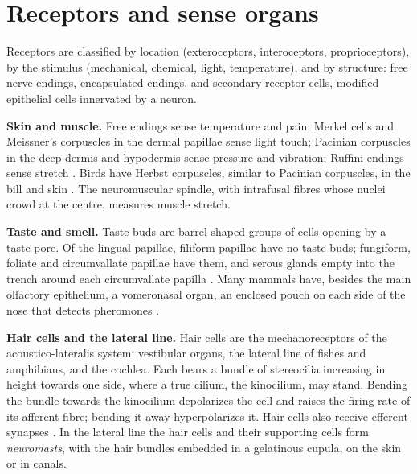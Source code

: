 \section{Receptors and sense organs}
\label{section-senses}

Receptors are classified by location
(exteroceptors, interoceptors,
proprioceptors), by the stimulus (mechanical,
chemical, light, temperature), and by
structure: free nerve endings, encapsulated
endings, and secondary receptor cells,
modified epithelial cells innervated by a
neuron.

\textbf{Skin and muscle.} Free endings sense
temperature and pain; Merkel cells and
Meissner's corpuscles in the dermal papillae
sense light touch; Pacinian corpuscles in the
deep dermis and hypodermis sense pressure and
vibration; Ruffini endings sense stretch
\cite[Chapter 15]{ross2011histology}. Birds
have Herbst corpuscles, similar to Pacinian
corpuscles, in the bill and skin
\cite[Chapter 9]{bacha2000veterinary}. The
neuromuscular spindle, with intrafusal fibres
whose nuclei crowd at the centre, measures
muscle stretch.

\textbf{Taste and smell.} Taste buds are
barrel-shaped groups of cells opening by a
taste pore. Of the lingual papillae, filiform
papillae have no taste buds; fungiform,
foliate and circumvallate papillae have them,
and serous glands empty into the trench
around each circumvallate papilla
\cite[Chapter 16]{ross2011histology}. Many
mammals have, besides the main olfactory
epithelium, a vomeronasal organ, an enclosed
pouch on each side of the nose that detects
pheromones \cite[Chapter 14]{hill2012animal}.

\textbf{Hair cells and the lateral line.}
Hair cells are the mechanoreceptors of the
acoustico-lateralis system: vestibular
organs, the lateral line of fishes and
amphibians, and the cochlea. Each bears a
bundle of stereocilia increasing in height
towards one side, where a true cilium, the
kinocilium, may stand. Bending the bundle
towards the kinocilium depolarizes the cell
and raises the firing rate of its afferent
fibre; bending it away hyperpolarizes it.
Hair cells also receive efferent synapses
\cite[Chapter 14]{hill2012animal}. In the
lateral line the hair cells and their
supporting cells form \emph{neuromasts}, with
the hair bundles embedded in a gelatinous
cupula, on the skin or in canals.

